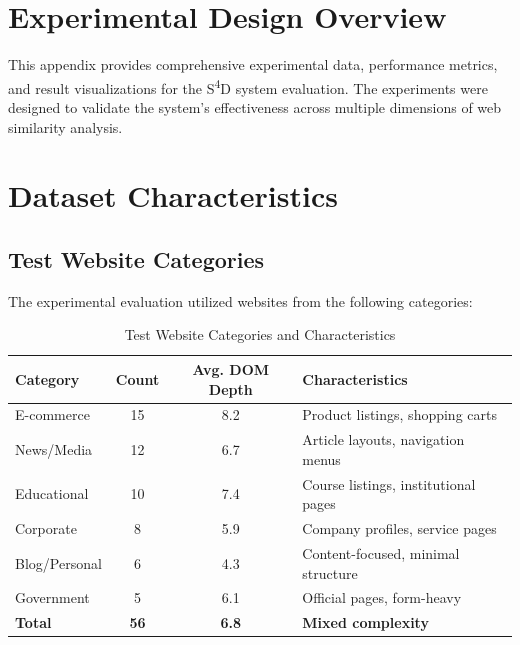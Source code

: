\section{Experimental Design Overview}
\label{sec:experimental-design}

This appendix provides comprehensive experimental data, performance metrics, and result visualizations for the S\textsuperscript{4}D system evaluation. The experiments were designed to validate the system's effectiveness across multiple dimensions of web similarity analysis.

\section{Dataset Characteristics}
\label{sec:dataset-characteristics}

\subsection{Test Website Categories}
\label{subsec:test-categories}

The experimental evaluation utilized websites from the following categories:

\begin{table}[htbp]
    \centering
    \caption{Test Website Categories and Characteristics}
    \label{tab:test-categories}
    \begin{tabular}{|l|c|c|l|}
        \hline
        \textbf{Category} & \textbf{Count} & \textbf{Avg. DOM Depth} & \textbf{Characteristics} \\
        \hline
        E-commerce & 15 & 8.2 & Product listings, shopping carts \\
        News/Media & 12 & 6.7 & Article layouts, navigation menus \\
        Educational & 10 & 7.4 & Course listings, institutional pages \\
        Corporate & 8 & 5.9 & Company profiles, service pages \\
        Blog/Personal & 6 & 4.3 & Content-focused, minimal structure \\
        Government & 5 & 6.1 & Official pages, form-heavy \\
        \hline
        \textbf{Total} & \textbf{56} & \textbf{6.8} & \textbf{Mixed complexity} \\
        \hline
    \end{tabular}
\end{table}

